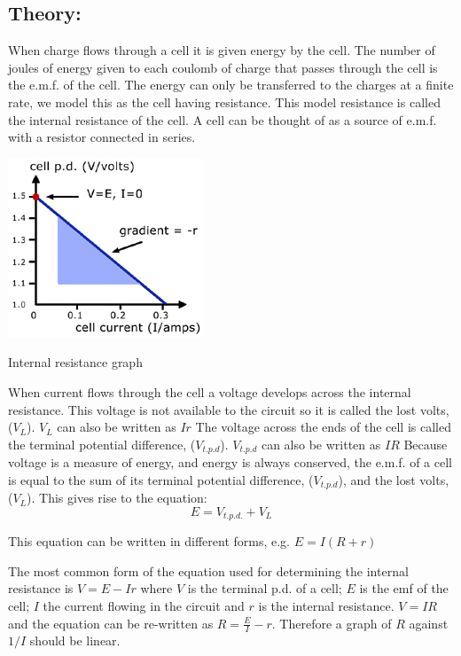 \documentclass{tufte-handout}
\begin{document}
\subsection{Theory:} 
When charge flows through a cell it is given energy by the cell.
The number of joules of energy given to each coulomb of charge that passes through the cell is the e.m.f. of the cell.
The energy can only be transferred to the charges at a finite rate, we model this as the cell having resistance. This model resistance is called the internal resistance of the cell. A cell can be thought of as a source of e.m.f. with a resistor connected in series.\begin{marginfigure}
\includegraphics[]{intr.jpg}
\caption{Internal resistance graph}
\end{marginfigure}
When current flows through the cell a voltage develops across the internal resistance. This voltage is not available to the circuit so it is called the lost volts, ($V_{L}$).
$V_{L}$ can also be written as $Ir$
The voltage across the ends of the cell is called the terminal potential difference, ($V_{t.p.d}$).
$V_{t.p.d}$ can also be written as $IR$
Because voltage is a measure of energy, and energy is always conserved, the e.m.f. of a cell is equal to the sum of its terminal potential difference, ($V_{t.p.d}$), and the lost volts, ($V_{L}$).
This gives rise to the equation: \[E = V_{t.p.d.}+ V_{L}\]

This equation can be written in different forms, e.g. $E = I (R + r)$

The most common form of the equation used for determining the internal resistance is $V =E-Ir$ where $V$ is the terminal p.d. of a cell; $E$ is the emf of the cell; $I$  the current flowing in the circuit and $r$ is the internal resistance.  $V = IR$ and the equation can be re-written as $ R=\frac{E}{I}-r$.  Therefore a graph of $R$ against $1/I$  should be linear.   
\end{document}
